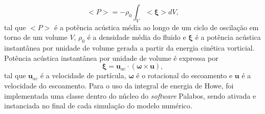 \begin{equation}
  <P> = -\rho_{0}\int_{V}< \boldsymbol{\xi} > dV,
  \label{eq:integral_howe_1}
\end{equation}
tal que $<P>$ é a potência acústica média ao longo de um ciclo de oscilação em torno de um volume $V$, $\rho_{0}$ é a densidade média do fluido e $\boldsymbol{\xi}$ é a potência acústica instantânea por unidade de volume gerada a partir da energia cinética vorticial. Potência acústica instantânea por unidade de volume é expressa por 
\begin{equation}
  \boldsymbol{\xi} = \textbf{u}_{ac} \cdot ( \boldsymbol{\omega} \times \textbf{u}),
  \label{eq:integral_howe_2}
\end{equation}
tal que $\textbf{u}_{ac}$ é a velocidade de partícula, $\boldsymbol{\omega}$ é o rotacional do escoamento e $\textbf{u}$ é a velocidade do escoamento. Para o uso da integral de energia de Howe, foi implementada uma classe dentro do núcleo do \textit{software} Palabos, sendo ativada e instanciada no final de cada simulação do modelo numérico.     